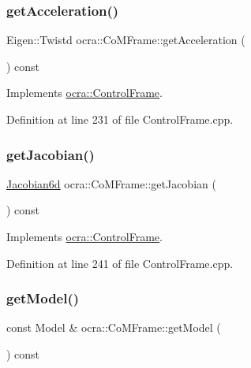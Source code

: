 \subsubsection{\texorpdfstring{get\+Acceleration()}{getAcceleration()}}
{\footnotesize\ttfamily Eigen\+::\+Twistd ocra\+::\+Co\+M\+Frame\+::get\+Acceleration (\begin{DoxyParamCaption}{ }\end{DoxyParamCaption}) const\hspace{0.3cm}{\ttfamily [virtual]}}



Implements \hyperlink{classocra_1_1ControlFrame_a0ceb7cd7c3fe90fa0ef311b96a6f5c88}{ocra\+::\+Control\+Frame}.



Definition at line 231 of file Control\+Frame.\+cpp.

\hypertarget{classocra_1_1CoMFrame_ab24f3400af3e8eb2a12d6597ff8a7a31}{}\label{classocra_1_1CoMFrame_ab24f3400af3e8eb2a12d6597ff8a7a31} 
\subsubsection{\texorpdfstring{get\+Jacobian()}{getJacobian()}}
{\footnotesize\ttfamily \hyperlink{namespaceocra_ac73b015f9f7cb0c252c4d5c4800f559a}{Jacobian6d} ocra\+::\+Co\+M\+Frame\+::get\+Jacobian (\begin{DoxyParamCaption}{ }\end{DoxyParamCaption}) const\hspace{0.3cm}{\ttfamily [virtual]}}



Implements \hyperlink{classocra_1_1ControlFrame_a14e0b855979be5dbd360314f25191e77}{ocra\+::\+Control\+Frame}.



Definition at line 241 of file Control\+Frame.\+cpp.

\hypertarget{classocra_1_1CoMFrame_afc280df9814e7eb2cf62f017f7bbfc2e}{}\label{classocra_1_1CoMFrame_afc280df9814e7eb2cf62f017f7bbfc2e} 
\subsubsection{\texorpdfstring{get\+Model()}{getModel()}}
{\footnotesize\ttfamily const Model \& ocra\+::\+Co\+M\+Frame\+::get\+Model (\begin{DoxyParamCaption}{ }\end{DoxyParamCaption}) const\hspace{0.3cm}{\ttfamily [virtual]}}




